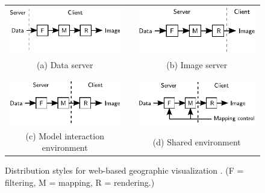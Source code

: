 \documentclass[acmtocl,acmnow]{acmtrans2m}
\begin{document}
\begin{figure}
	\begin{center}
		\begin{tabular}{ccc}
			\includegraphics[scale=1]{data_server}	&
			\qquad	&
			\includegraphics[scale=1]{image_server}	\\
			\footnotesize (a) Data server	&
			\qquad	&
			\footnotesize (b) Image server	\\
			\\
			\\
			\includegraphics[scale=1]{model_interaction}	&
			\qquad	&
			\includegraphics[scale=1]{shared}	\\
			\footnotesize (c) Model interaction environment	&
			\qquad	&
			\footnotesize (d) Shared environment	\\
		\end{tabular}
	\end{center}
	\caption{Distribution styles for web-based geographic visualization
	\protect\cite{Wood-J-1996-vis}. (F = filtering, M = mapping, R =
	rendering.)}
	\label{fig-distribution-styles}
\end{figure}
\end{document}
